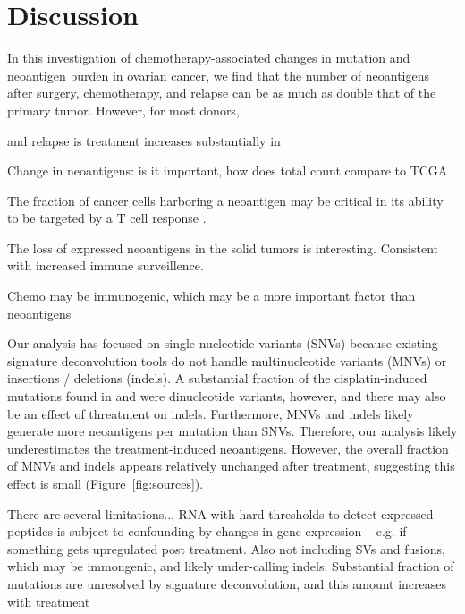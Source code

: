 \section*{Discussion}

In this investigation of chemotherapy-associated changes in mutation and neoantigen burden in ovarian cancer, we find that the number of neoantigens after surgery, chemotherapy, and relapse can be as much as double that of the primary tumor. However, for most donors, 

and relapse is  treatment increases substantially in  

Change in neoantigens: is it important, how does total count compare to TCGA

The fraction of cancer cells harboring a neoantigen may be critical in its ability to be targeted by a T cell response \cite{McGranahan_2016}.

The loss of expressed neoantigens in the solid tumors is interesting. Consistent with increased immune surveillence.

Chemo may be immunogenic, which may be a more important factor than neoantigens

Our analysis has focused on single nucleotide variants (SNVs) because existing signature deconvolution tools do not handle multinucleotide variants (MNVs) or insertions / deletions (indels). A substantial fraction of the cisplatin-induced mutations found in \cite{Meier_2014} and \cite{Szikriszt_2016} were dinucleotide variants, however, and there may also be an effect of threatment on indels. Furthermore, MNVs and indels likely generate more neoantigens per mutation than SNVs. Therefore, our analysis likely underestimates the treatment-induced neoantigens. However, the overall fraction of MNVs and indels appears relatively unchanged after treatment, suggesting this effect is small (Figure~\ref{fig:sources}).

There are several limitations... RNA with hard thresholds to detect expressed peptides is subject to confounding by changes in gene expression -- e.g. if something gets upregulated post treatment. Also not including SVs and fusions, which may be immongenic, and likely under-calling indels. Substantial fraction of mutations are unresolved by signature deconvolution, and this amount increases with treatment